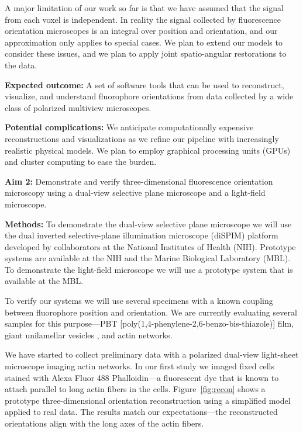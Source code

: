 \documentclass[11pt]{article}
\begin{document}
A major limitation of our work so far is that we have assumed that the signal
from each voxel is independent. In reality the signal collected by fluorescence
orientation microscopes is an integral over position and orientation, and our
approximation only applies to special cases. We plan to extend our models to
consider these issues, and we plan to apply joint spatio-angular restorations to
the data.

\noindent\textbf{Expected outcome:} A set of software tools that can be used
to reconstruct, visualize, and understand fluorophore orientations from data
collected by a wide class of polarized multiview microscopes.

\noindent\textbf{Potential complications:} We anticipate computationally
expensive reconstructions and visualizations as we refine our pipeline with
increasingly realistic physical models. We plan to employ graphical processing
units (GPUs) and cluster computing to ease the burden.

\noindent\textbf{Aim 2:} Demonstrate and verify three-dimensional fluorescence
orientation microscopy using a dual-view selective plane microscope and a
light-field microscope.

\noindent\textbf{Methods:} To demonstrate the dual-view selective plane
microscope we will use the dual inverted selective-plane illumination
microscope (diSPIM) platform developed by collaborators at the National
Institutes of Health (NIH). Prototype systems are available at the NIH and the
Marine Biological Laboratory (MBL). To demonstrate the light-field microscope we
will use a prototype system that is available at the MBL.

To verify our systems we will use several specimens with a known coupling
between fluorophore position and orientation. We are currently evaluating
several samples for this purpose---PBT
[poly(1,4-phenylene-2,6-benzo-bis-thiazole)] film, giant unilamellar vesicles
\cite{schmid}, and actin networks.

We have started to collect preliminary data with a polarized dual-view
light-sheet microscope imaging actin networks. In our first study we imaged
fixed cells stained with Alexa Fluor 488 Phalloidin---a fluorescent dye that is
known to attach parallel to long actin fibers in the cells.
Figure~\ref{fig:recon} shows a prototype three-dimensional orientation
reconstruction using a simplified model applied to real data. The results match
our expectations---the reconstructed orientations align with the long axes of
the actin fibers.
\end{document}
